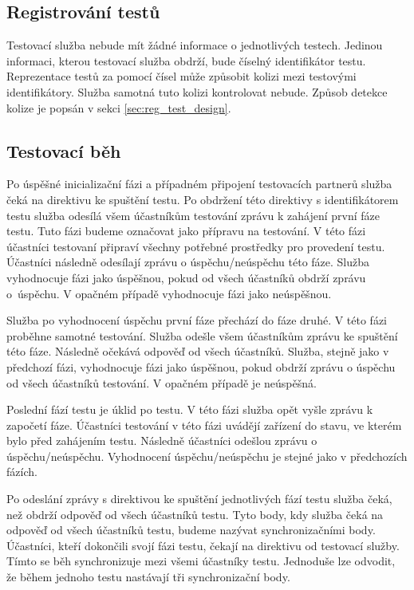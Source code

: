 \subsection{Registrování testů}
Testovací služba nebude mít žádné informace o jednotlivých testech. Jedinou informaci, kterou testovací služba obdrží, bude číselný identifikátor testu. Reprezentace testů za pomocí čísel může způsobit kolizi mezi testovými identifikátory. Služba samotná tuto kolizi kontrolovat nebude. Způsob detekce kolize je popsán v sekci \ref{sec:reg_test_design}.

\subsection{Testovací běh}\label{sec:test_run}
Po úspěšné inicializační fázi a případném připojení testovacích partnerů služba čeká na direktivu ke spuštění testu. Po obdržení této direktivy s identifikátorem testu služba odesílá všem účastníkům testování zprávu k zahájení první fáze testu. Tuto fázi budeme označovat jako přípravu na testování. V této fázi účastníci testovaní připraví všechny potřebné prostředky pro provedení testu. Účastníci následně odesílají zprávu o úspěchu/neúspěchu této fáze. Služba vyhodnocuje fázi jako úspěšnou, pokud od všech účastníků obdrží zprávu o~úspěchu. V opačném případě vyhodnocuje fázi jako neúspěšnou.

Služba po vyhodnocení úspěchu první fáze přechází do fáze druhé. V této fázi proběhne samotné testování. Služba odešle všem účastníkům zprávu ke spuštění této fáze. Následně očekává odpověď od všech účastníků. Služba, stejně jako v předchozí fázi, vyhodnocuje fázi jako úspěšnou, pokud obdrží zprávu o úspěchu od všech účastníků testování. V opačném případě je neúspěšná.

Poslední fází testu je úklid po testu. V této fázi služba opět vyšle zprávu k započetí fáze. Účastníci testování v této fázi uvádějí zařízení do stavu, ve kterém bylo před zahájením testu. Následně účastníci odešlou zprávu o úspěchu/neúspěchu. Vyhodnocení úspěchu/neúspěchu je stejné jako v předchozích fázích.

Po odeslání zprávy s direktivou ke spuštění jednotlivých fází testu služba čeká, než obdrží odpověď od všech účastníků testu. Tyto body, kdy služba čeká na odpověď od všech účastníků testu, budeme nazývat synchronizačními body. Účastníci, kteří dokončili svojí fázi testu, čekají na direktivu od testovací služby. Tímto se běh synchronizuje mezi všemi účastníky testu. Jednoduše lze odvodit, že během jednoho testu nastávají tři synchronizační body. 

